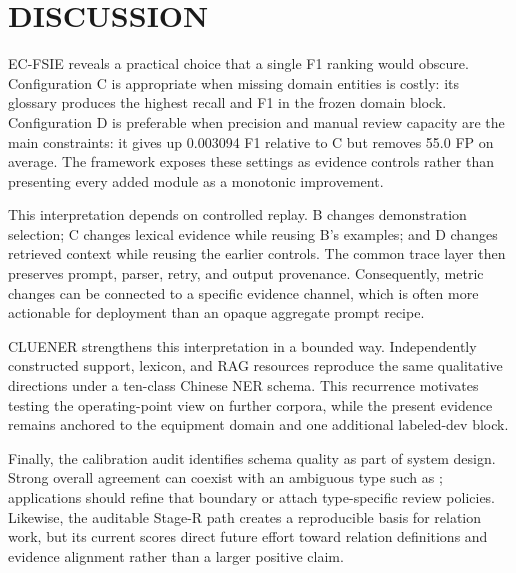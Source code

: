 \section{DISCUSSION}

EC-FSIE reveals a practical choice that a single F1 ranking would obscure.
Configuration C is appropriate when missing domain entities is costly: its
glossary produces the highest recall and F1 in the frozen domain block.
Configuration D is preferable when precision and manual review capacity are
the main constraints: it gives up 0.003094 F1 relative to C but removes 55.0
FP on average. The framework exposes these settings as evidence controls rather
than presenting every added module as a monotonic improvement.

This interpretation depends on controlled replay. B changes demonstration
selection; C changes lexical evidence while reusing B's examples; and D changes
retrieved context while reusing the earlier controls. The common trace layer
then preserves prompt, parser, retry, and output provenance. Consequently,
metric changes can be connected to a specific evidence channel, which is often
more actionable for deployment than an opaque aggregate prompt recipe.

CLUENER strengthens this interpretation in a bounded way. Independently
constructed support, lexicon, and RAG resources reproduce the same qualitative
directions under a ten-class Chinese NER schema. This recurrence motivates
testing the operating-point view on further corpora, while the present evidence
remains anchored to the equipment domain and one additional labeled-dev block.

Finally, the calibration audit identifies schema quality as part of system
design. Strong overall agreement can coexist with an ambiguous type such as
; applications should refine that boundary or attach
type-specific review policies. Likewise, the auditable Stage-R path creates a
reproducible basis for relation work, but its current scores direct future
effort toward relation definitions and evidence alignment rather than a larger
positive claim.
